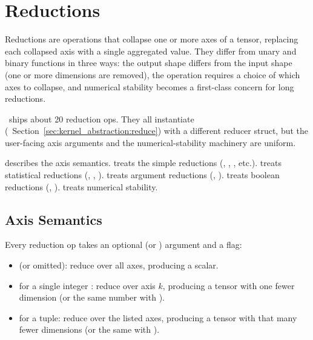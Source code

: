 \chapter{Reductions}
\label{ch:reductions}

Reductions are operations that collapse one or more axes of a
tensor, replacing each collapsed axis with a single aggregated
value. They differ from unary and binary functions in three ways:
the output shape differs from the input shape (one or more
dimensions are removed), the operation requires a choice of which
axes to collapse, and numerical stability becomes a first-class
concern for long reductions.

\Lucid\ ships about 20 reduction ops. They all instantiate
(~Section~\ref{sec:kernel_abstraction:reduce})
with a different reducer struct, but the user-facing axis
arguments and the numerical-stability machinery are uniform.

 describes the axis semantics.
 treats the simple reductions
(, , , etc.).
 treats statistical reductions
(, , ).
 treats argument reductions
(, ).
 treats boolean reductions
(, ).
 treats numerical stability.

\section{Axis Semantics}
\label{sec:reductions:semantics}

Every reduction op takes an optional  (or )
argument and a  flag:

\begin{itemize}
  \item {} (or omitted): reduce over all axes,
    producing a scalar.
  \item {} for a single integer : reduce over
    axis \(k\), producing a tensor with one fewer dimension (or
    the same number with ).
  \item {} for a tuple: reduce over the
    listed axes, producing a tensor with that many fewer
    dimensions (or the same with ).
\end{itemize}

